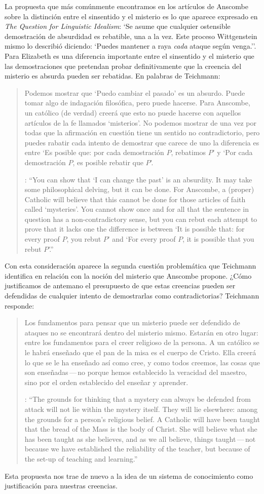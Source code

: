 La propuesta que más comúnmente encontramos en los artículos de Anscombe sobre la distinción entre el sinsentido y el misterio es lo que aparece expresado en \emph{The Question for Linguistic Idealism}: \enquote*{Se asume que cualquier ostensible demostración de absurdidad es rebatible, una a la vez. Este proceso Wittgenstein mismo lo describió diciendo: `Puedes mantener a raya \emph{cada} ataque según venga.'}. Para Elizabeth es una diferencia importante entre el sinsentido y el misterio que las demostraciones que pretendan probar definitivamente que la creencia del misterio es absurda pueden ser rebatidas. En palabras de Teichmann: \blockquote[{\cite[213--214]{teichmann2008ans}}: \enquote{You can show that `I can change the past' is an absurdity. It may take some philosophical delving, but it can be done. For Anscombe, a (proper) Catholic will believe that this cannot be done for those articles of faith called `mysteries'. \textelp{} You cannot show once and for all that the sentence in question has a non-contradictory sense, but you can rebut each attempt to prove that it lacks one \textelp{} the difference is between `It is possible that: for every proof $P$, you rebut $P$' and `For every proof $P$, it is possible that you rebut $P$'.}]{Podemos mostrar que `Puedo cambiar el pasado' es un absurdo. Puede tomar algo de indagación filosófica, pero puede hacerse. Para Anscombe, un católico (de verdad) creerá que esto no puede hacerse con aquellos artículos de la fe llamados `misterios'. \textelp{} No podemos mostrar de una vez por todas que la afirmación en cuestión tiene un sentido no contradictorio, pero puedes rabatir cada intento de demostrar que carece de uno \textelp{} la diferencia es entre `Es posible que: por cada demostración $P$, rebatimos $P$' y `Por cada demostración $P$, es posible rebatir que $P$'.} Con esta consideración aparece la segunda cuestión problemática que Teichmann identifica en relación con la noción del misterio que Anscombe propone. ¿Cómo justificamos de antemano el presupuesto de que estas creencias pueden ser defendidas de cualquier intento de demostrarlas como contradictorias? Teichmann responde: \blockquote[{\cite[213--214]{teichmann2008ans}}: \enquote{The grounds for thinking that a mystery can always be defended from attack will not lie within the mystery itself. They will lie elsewhere: among the grounds for a person's religious belief. A Catholic will have been taught that the bread of the Mass is the body of Christ. She will believe what she has been taught as she believes, and as we all believe, things taught\,---\,not because we have established the reliability of the teacher, but because of the set-up of teaching and learning.}]{Los fundamentos para pensar que un misterio puede ser defendido de ataques no se encontrará dentro del misterio mismo. Estarán en otro lugar: entre los fundamentos para el creer religioso de la persona. A un católico se le habrá enseñado que el pan de la misa es el cuerpo de Cristo. Ella creerá lo que se le ha enseñado así como cree, y como todos creemos, las cosas que son enseñadas\,---\,no porque hemos establecido la veracidad del maestro, sino por el orden establecido del enseñar y aprender.} Esta propuesta nos trae de nuevo a la idea de un sistema de conocimiento como justificación para nuestras creencias.

